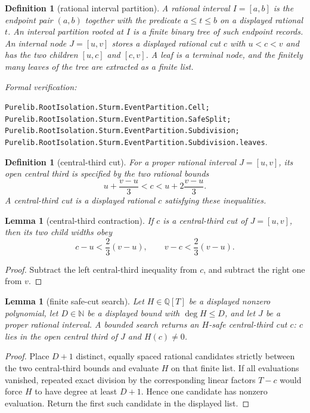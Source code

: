 \documentclass[11pt]{article}
\newtheorem{lemma}[theorem]{Lemma}
\newtheorem{definition}[theorem]{Definition}
\newcommand{\Q}{\mathbb{Q}}
\newcommand{\N}{\mathbb{N}}
\newcommand{\leanref}[1]{\par\smallskip\noindent
  \emph{Formal verification:}\par\nobreak
  {\raggedright\nolinkurl{#1}.\par}}
\begin{document}
\begin{definition}[rational interval partition]
\label{def:rational-interval-partition}
A rational interval $I=[a,b]$ is the endpoint pair $(a,b)$ together with the
predicate $a\le t\le b$ on a displayed rational $t$.  An \emph{interval
partition} rooted at $I$ is a finite binary tree of such endpoint records.
An internal node $J=[u,v]$ stores a displayed rational cut $c$ with $u<c<v$
and has the two children $[u,c]$ and $[c,v]$.  A \emph{leaf} is a terminal
node, and the finitely many leaves of the tree are extracted as a finite
list.
\end{definition}

\leanref{Purelib.RootIsolation.Sturm.EventPartition.Cell;
Purelib.RootIsolation.Sturm.EventPartition.SafeSplit;
Purelib.RootIsolation.Sturm.EventPartition.Subdivision;
Purelib.RootIsolation.Sturm.EventPartition.Subdivision.leaves}

\begin{definition}[central-third cut]
\label{def:central-third-cut}
For a proper rational interval $J=[u,v]$, its \emph{open central third} is
specified by the two rational bounds
\[
 u+\frac{v-u}{3}<c< u+2\frac{v-u}{3}.
\]
A \emph{central-third cut} is a displayed rational $c$ satisfying these
inequalities.
\end{definition}

\begin{lemma}[central-third contraction]
\label{lem:central-third-contraction}
If $c$ is a central-third cut of $J=[u,v]$, then its two child widths obey
\[
 c-u<\frac23(v-u),\qquad v-c<\frac23(v-u).
\]
\end{lemma}

\begin{proof}
Subtract the left central-third inequality from $c$, and subtract the right
one from $v$.
\end{proof}

\begin{lemma}[finite safe-cut search]
\label{lem:safe-central-third-cut}
Let $H\in\Q[T]$ be a displayed nonzero polynomial, let $D\in\N$ be a
displayed bound with $\deg H\le D$, and let $J$ be a proper rational
interval.  A bounded search returns an $H$-safe central-third cut $c$:
$c$ lies in the open central third of $J$ and $H(c)\ne0$.
\end{lemma}

\begin{proof}
Place $D+1$ distinct, equally spaced rational candidates strictly between
the two central-third bounds and evaluate $H$ on that finite list.  If all
evaluations vanished, repeated exact division by the corresponding linear
factors $T-c$ would force $H$ to have degree at least $D+1$.  Hence one
candidate has nonzero evaluation.  Return the first such candidate in the
displayed list.
\end{proof}
\end{document}
